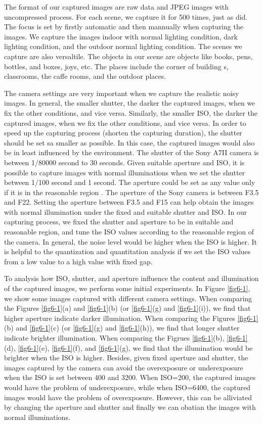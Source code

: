 The format of our captured images are raw data and JPEG images with uncompressed process. For each scene, we capture it for 500 times, just as \cite{crosschannel2016} did. The focus is set by firstly automatic and then mannually when capturing the images. We capture the images indoor with normal lighting condition, dark lighting condition, and the outdoor normal lighting condition. The scenes we capture are also versaltile. The objects in our scene are objects like books, pens, bottles, and boxes, joys, etc. The places include the corner of building s, classrooms, the caffe rooms, and the outdoor places.

The camera settings are very important when we capture the realistic noisy images. In general, the smaller shutter, the darker the captured images, when we fix the other conditions, and vice versa. Similarly, the smaller ISO, the darker the captured images, when we fix the other conditions, and vice versa. In order to speed up the capturing process (shorten the capturing duration), the shutter should be set sa smaller as possible. In this case, the captured images would also be in least influenced by the environment. The shutter of the Sony A7II camera is between 1/80000 second to 30 seconds. Given suitable aperture and ISO, it is possible to capture images with normal illuminations when we set the shutter between 1/100 second and 1 second. The aperture could be set as any value only if it is in the reasonable region . The aperture of the Sony camera is between F3.5 and F22. Setting the aperture between F3.5 and F15 can help obtain the images with normal illumination under the fixed and suitable shutter and ISO. In our capturing process, we fixed the shutter and aperture to be in suitable and reasonable region, and tune the ISO values according to the reasonable region of the camera. In general, the noise level would be higher when the ISO is higher. It is helpful to the quantization and quantitation analysis if we set the ISO values from a low value to a high value with fixed gap.

To analysis how ISO, shutter, and aperture influence the content and illumination of the captured images, we perform some initial experiments. In Figure \ref{fig6-1}, we show some images captured with different camera settings. When comparing the Figures \ref{fig6-1}(a) and \ref{fig6-1}(b) (or \ref{fig6-1}(g) and \ref{fig6-1}(i)), we find that higher aperture indicate darker illumination. When comparing the Figures \ref{fig6-1}(b) and \ref{fig6-1}(c) (or \ref{fig6-1}(g) and \ref{fig6-1}(h)), we find that longer shutter indicate brighter illumination. When comparing the Figrues \ref{fig6-1}(b), \ref{fig6-1}(d), \ref{fig6-1}(e), \ref{fig6-1}(f), and \ref{fig6-1}(g), we find that the illumination would be brighter when the ISO is higher. Besides, given fixed aperture and shutter, the images captured by the camera can avoid the overexposure or underexposure when the ISO is set between 400 and 3200.  When ISO=200, the captured images would have the problem of underexposure, while when ISO=6400, the captured images would have the problem of overexposure. However, this can be alliviated by changing the aperture and shutter and finally we can obatian the images with normal illuminations.

